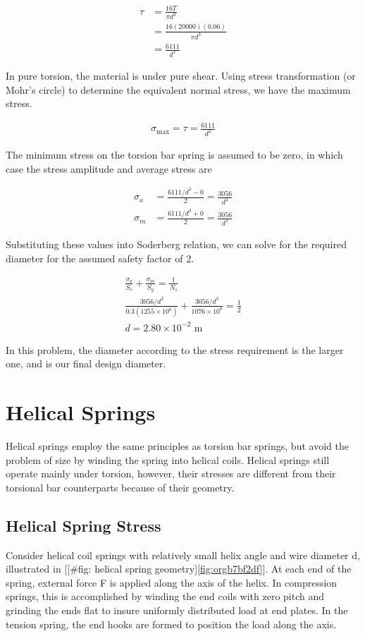 \documentclass[a4paper,openany,12pt]{book}
\begin{document}
{{$$\begin{aligned}
    \tau  &= \frac{16T}{\pi d^3} \\
          &= \frac{16(20000)(0.06)}{\pi d^3} \\
          &= \frac{6111}{d^3}
  \end{aligned}$$

In pure torsion, the material is under pure shear. Using stress
transformation (or Mohr's circle) to determine the equivalent normal
stress, we have the maximum stress.

$$\begin{gathered}
    \sigma_{\max} = \tau = \frac{6111}{d^3}
  \end{gathered}$$

The minimum stress on the torsion bar spring is assumed to be zero, in
which case the stress amplitude and average stress are

$$\begin{aligned}
    \sigma_a &= \frac{6111/d^3 - 0}{2} = \frac{3056}{d^3} \\
    \sigma_m &= \frac{6111/d^3 + 0}{2} = \frac{3056}{d^3}
  \end{aligned}$$

Substituting these values into Soderberg relation, we can solve for the
required diameter for the assumed safety factor of 2.

$$\begin{gathered}
    \frac{\sigma_a}{S_e} + \frac{\sigma_m}{S_y} = \frac{1}{N_s} \\
    \frac{3056/d^3}{0.3(1255 \times 10^6)} + \frac{3056/d^3}{1076 \times 10^6} = \frac{1}{2} \\
    d = 2.80 \times 10^{-2} \text{ m}
  \end{gathered}$$

In this problem, the diameter according to the stress requirement is the
larger one, and is our final design diameter.

\section{Helical Springs}
\label{sec:org1f22e39}
Helical springs employ the same principles as torsion bar springs, but
avoid the problem of size by winding the spring into helical coils.
Helical springs still operate mainly under torsion, however, their
stresses are different from their torsional bar counterparts because of
their geometry.

\subsection{Helical Spring Stress}
\label{sec:org88cb4e2}
Consider helical coil springs with relatively small helix angle and wire
diameter d, illustrated in
[[\#fig: helical spring geometry]\ref{fig:orgb7bf2df}]. At
each end of the spring, external force F is applied along the axis of
the helix. In compression springs, this is accomplished by winding the
end coils with zero pitch and grinding the ends flat to insure uniformly
distributed load at end plates. In the tension spring, the end hooks are
formed to position the load along the axis.


}}
\end{document}
